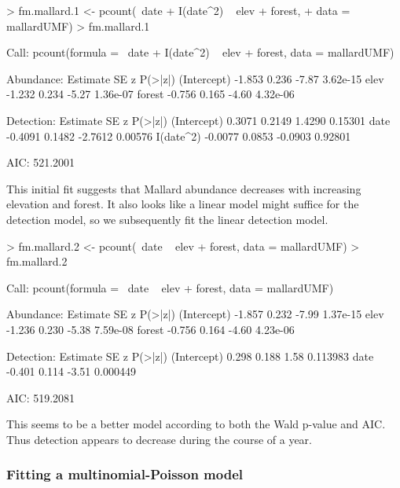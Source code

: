 \documentclass[article,shortnames]{jss}
\begin{document}
\begin{Schunk}
\begin{Sinput}
> fm.mallard.1 <- pcount(~date + I(date^2) ~ elev + forest, 
+     data = mallardUMF)
> fm.mallard.1
\end{Sinput}
\begin{Soutput}
Call:
pcount(formula = ~date + I(date^2) ~ elev + forest, data = mallardUMF)

Abundance:
            Estimate    SE     z  P(>|z|)
(Intercept)   -1.853 0.236 -7.87 3.62e-15
elev          -1.232 0.234 -5.27 1.36e-07
forest        -0.756 0.165 -4.60 4.32e-06

Detection:
            Estimate     SE       z P(>|z|)
(Intercept)   0.3071 0.2149  1.4290 0.15301
date         -0.4091 0.1482 -2.7612 0.00576
I(date^2)    -0.0077 0.0853 -0.0903 0.92801

AIC: 521.2001 
\end{Soutput}
\end{Schunk}

This initial fit suggests that Mallard abundance decreases with
increasing elevation and forest.  It also looks like a linear model
might suffice for the detection model, so we subsequently fit the
linear detection model.


\begin{Schunk}
\begin{Sinput}
> fm.mallard.2 <- pcount(~date ~ elev + forest, data = mallardUMF)
> fm.mallard.2
\end{Sinput}
\begin{Soutput}
Call:
pcount(formula = ~date ~ elev + forest, data = mallardUMF)

Abundance:
            Estimate    SE     z  P(>|z|)
(Intercept)   -1.857 0.232 -7.99 1.37e-15
elev          -1.236 0.230 -5.38 7.59e-08
forest        -0.756 0.164 -4.60 4.23e-06

Detection:
            Estimate    SE     z  P(>|z|)
(Intercept)    0.298 0.188  1.58 0.113983
date          -0.401 0.114 -3.51 0.000449

AIC: 519.2081 
\end{Soutput}
\end{Schunk}

This seems to be a better model according to both the Wald p-value and
AIC.  Thus detection appears to decrease during the course of a year.



\subsubsection{Fitting a multinomial-Poisson model}
\end{document}
